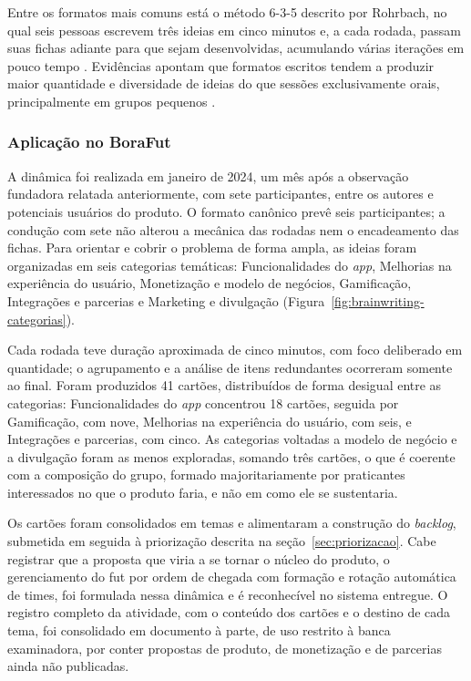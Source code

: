             Entre os formatos mais comuns está o método 6-3-5 descrito por Rohrbach, no qual seis pessoas escrevem três ideias em cinco minutos e, a cada rodada, passam suas fichas adiante para que sejam desenvolvidas, acumulando várias iterações em pouco tempo \cite{rohrbach1969}. Evidências apontam que formatos escritos tendem a produzir maior quantidade e diversidade de ideias do que sessões exclusivamente orais, principalmente em grupos pequenos \cite{paulus2007}.

            \subsubsection*{Aplicação no BoraFut}
            A dinâmica foi realizada em janeiro de 2024, um mês após a observação fundadora relatada anteriormente, com sete participantes, entre os autores e potenciais usuários do produto. O formato canônico prevê seis participantes; a condução com sete não alterou a mecânica das rodadas nem o encadeamento das fichas. Para orientar e cobrir o problema de forma ampla, as ideias foram organizadas em seis categorias temáticas: Funcionalidades do \textit{app}, Melhorias na experiência do usuário, Monetização e modelo de negócios, Gamificação, Integrações e parcerias e Marketing e divulgação (Figura~\ref{fig:brainwriting-categorias}).

            Cada rodada teve duração aproximada de cinco minutos, com foco deliberado em quantidade; o agrupamento e a análise de itens redundantes ocorreram somente ao final. Foram produzidos 41 cartões, distribuídos de forma desigual entre as categorias: Funcionalidades do \textit{app} concentrou 18 cartões, seguida por Gamificação, com nove, Melhorias na experiência do usuário, com seis, e Integrações e parcerias, com cinco. As categorias voltadas a modelo de negócio e a divulgação foram as menos exploradas, somando três cartões, o que é coerente com a composição do grupo, formado majoritariamente por praticantes interessados no que o produto faria, e não em como ele se sustentaria.

            Os cartões foram consolidados em temas e alimentaram a construção do \textit{backlog}, submetida em seguida à priorização descrita na seção~\ref{sec:priorizacao}. Cabe registrar que a proposta que viria a se tornar o núcleo do produto, o gerenciamento do fut por ordem de chegada com formação e rotação automática de times, foi formulada nessa dinâmica e é reconhecível no sistema entregue. O registro completo da atividade, com o conteúdo dos cartões e o destino de cada tema, foi consolidado em documento à parte, de uso restrito à banca examinadora, por conter propostas de produto, de monetização e de parcerias ainda não publicadas.

